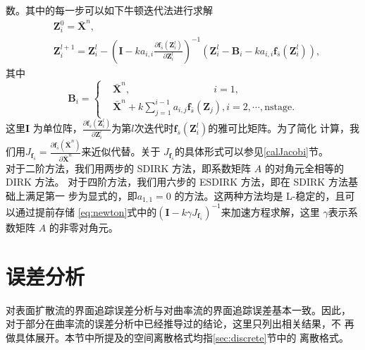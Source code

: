 \documentclass[a4paper,twoside]{ctexart}
\newcommand{\pdfrac}[2]{\frac{\partial #1}{\partial #2}}
\begin{document}
数。其中的每一步可以如下牛顿迭代法进行求解
\begin{equation}
  \label{eq:newton}
  \begin{aligned}
    &\boldsymbol Z_i^0 = \bar{\boldsymbol X}^n,\\
    &\boldsymbol Z_i^{l+1} = \boldsymbol Z_i^{l} - (\boldsymbol I -
    ka_{i,i}\pdfrac{\boldsymbol f_{\bar{s}}(\boldsymbol
      Z_i^l)}{\boldsymbol Z_i^l})^{-1}(\boldsymbol Z_i^l - \boldsymbol
    B_i - ka_{i,i}\boldsymbol f_{\bar{s}}(\boldsymbol Z_i^l)),
  \end{aligned}
\end{equation}
其中
\begin{equation}
  \label{eq:Bi}
  \boldsymbol B_i = 
  \left\{
\begin{aligned}
  &\bar{\boldsymbol X}^{n}, \quad \quad \quad \quad\ \ \quad \quad \quad \quad i=1,\\
  &\bar{\boldsymbol X}^{n} + k{\textstyle \sum_{j=1}^{i-1}}a_{i,j}
 \boldsymbol f_{\bar{s}}(\boldsymbol
 Z_j),i=2,\cdots,\text{nstage}.
\end{aligned}
\right.
\end{equation}
这里$\boldsymbol I$ 为单位阵，$\pdfrac{\boldsymbol f_{\bar{s}}(\boldsymbol Z_i^l)}{\boldsymbol Z_i^l}$为第$l$次迭代时$\boldsymbol f_{\bar{s}}(\boldsymbol Z_i^l)$的雅可比矩阵。为了简化
  计算，我们用$J_{\boldsymbol f_{\bar{s}}}=\pdfrac{\boldsymbol f_{\bar{s}}(\bar{\boldsymbol
      X}^{n})}{\bar{\boldsymbol X}^{n}}$来近似代替。关于
  $J_{\boldsymbol f_{\bar{s}}}$的具体形式可以参见\ref{calJacobi}节。\\
  \indent 对于二阶方法，我们用两步的 SDIRK 方法，即系数矩阵 $A$ 的对角元全相等的 DIRK 方法。
对于四阶方法，我们用六步的 ESDIRK 方法，即在 SDIRK 方法基础上满足第一
步为显式的，即$a_{1,1} = 0$ 的方法。这两种方法均是 L-稳定的，且可以通过提前存储
\eqref{eq:newton}式中的$(\boldsymbol I -
    k\gamma J_{\boldsymbol f_{\bar{s}}})^{-1}$来加速方程求解，这里
    $\gamma$表示系数矩阵 $A$ 的非零对角元。
  \section{误差分析}
  \label{erranalysis}
  对表面扩散流的界面追踪误差分析与对曲率流的界面追踪误差基本一致。因此，
  对于部分在曲率流的误差分析中已经推导过的结论，这里只列出相关结果，不
  再做具体展开。本节中所提及的空间离散格式均指\ref{sec:discrete}节中的
  离散格式。
\end{document}
